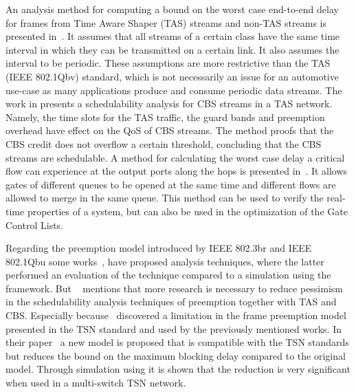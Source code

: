 An analysis method for computing a bound on the worst case end-to-end delay for frames from Time Aware Shaper (TAS) streams and non-TAS streams is presented in~\cite{thiele2015formal}. It assumes that all streams of a certain class have the same time interval in which they can be transmitted on a certain link. It also assumes the interval to be periodic. These assumptions are more restrictive than the TAS (IEEE 802.1Qbv) standard, which is not necessarily an issue for an automotive use-case as many applications produce and consume periodic data streams. The work in \cite{zhao2018timing} presents a schedulability analysis for CBS streams in a TAS network. Namely, the time slots for the TAS traffic, the guard bands and preemption overhead have effect on the QoS of CBS streams. The method proofs that the CBS credit does not overflow a certain threshold, concluding that the CBS streams are schedulable. A method for calculating the worst case delay a critical flow can experience at the output ports along the hops is presented in~\cite{zhao2018worst}. It allows gates of different queues to be opened at the same time and different flows are allowed to merge in the same queue. This method can be used to verify the real-time properties of a system, but can also be used in the optimization of the Gate Control Lists.

Regarding the preemption model introduced by IEEE 802.3br and IEEE 802.1Qbu some works~\cite{thiele2016formal},\cite{bello2020schedulability} have proposed analysis techniques, where the latter performed an evaluation of the technique compared to a simulation using the \omnet framework. But ~\cite{ashjaei2021time} mentions that more research is necessary to reduce pessimism in the schedulability analysis techniques of preemption together with TAS and CBS. Especially because~\cite{ashjaei2021novel} discovered a limitation in the frame preemption model presented in the TSN standard and used by the previously mentioned works. In their paper~\cite{ashjaei2021novel} a new model is proposed that is compatible with the TSN standards but reduces the bound on the maximum blocking delay compared to the original model. Through simulation using \omnet it is shown that the reduction is very significant when used in a multi-switch TSN network.

